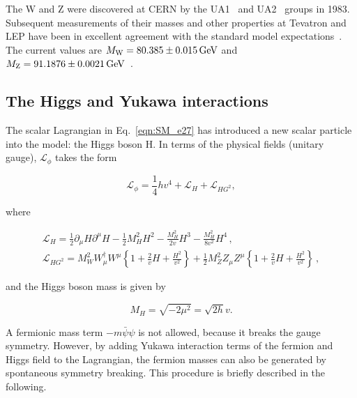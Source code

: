 The W and Z were discovered at CERN by the UA1~\cite{ARNISON1986484} and UA2~\cite{ANSARI1987440} groups in 1983.
Subsequent measurements of their masses and other properties at Tevatron and LEP have been in excellent agreement with the standard model expectations~\cite{Schael:2013ita,Aaltonen:2013iut}. The current values are $M_\mathrm{W} = 80.385 \pm 0.015\,\text{Ge\hspace{-.08em}V}$ and $M_\mathrm{Z} = 91.1876 \pm 0.0021\,\text{Ge\hspace{-.08em}V}$~\cite{Olive:2016xmw}.

\subsection{The Higgs and Yukawa interactions}\label{subsec:HiggsBoson}

The scalar Lagrangian in Eq.~\ref{eqn:SM_e27} has introduced a new scalar particle into the model: the Higgs boson H.
In terms of the physical fields (unitary gauge), $\mathcal{L}_\phi$ takes the form

\begin{equation}\label{eqn:SM_e36}
\mathcal{L}_\phi = \frac{1}{4}hv^4 + \mathcal{L}_H + \mathcal{L}_{HG^2}, 
\end{equation}

\noindent where

\begin{equation}\label{eqn:SM_e37}
\begin{gathered}
\mathcal{L}_H = \frac{1}{2}\partial_\mu H\partial^\mu H - \frac{1}{2}M^2_HH^2 -\frac{M^2_H}{2v}H^3 -\frac{M^2_H}{8v^2}H^4 \, , \\
\mathcal{L}_{HG^2} = M^2_WW^\dag_\mu W^\mu \left\{ 1 + \frac{2}{v}H + \frac{H^2}{v^2} \right\} + \frac{1}{2}M^2_ZZ_\mu Z^\mu \left\{ 1 + \frac{2}{v}H + \frac{H^2}{v^2} \right\} \, ,
\end{gathered}
\end{equation}

\noindent and the Higgs boson mass is given by

\begin{equation}\label{eqn:SM_e38}
M_H = \sqrt{-2\mu^2} = \sqrt{2h}v.
\end{equation}
 
A fermionic mass term $-m\bar{\psi}\psi$ is not allowed, because it breaks the gauge symmetry.
However, by adding Yukawa interaction terms of the fermion and Higgs field to the Lagrangian, the fermion masses can also be generated by spontaneous symmetry breaking.
This procedure is briefly described in the following.

